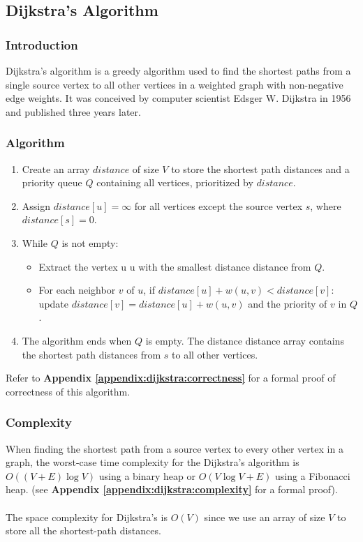 	\subsection{Dijkstra's Algorithm}
		\subsubsection{Introduction}
			Dijkstra's algorithm is a greedy algorithm used to find the shortest paths from a single source vertex to all other vertices in a weighted graph with non-negative edge weights. It was conceived by computer scientist Edsger W. Dijkstra in 1956 and published three years later.
		\subsubsection{Algorithm}
		\begin{enumerate}
			\item Create an array $distance$ of size $V$ to store the shortest path distances and a priority queue $Q$ containing all vertices, prioritized by $distance$.
			\item Assign $distance[u] = \infty$ for all vertices except the source vertex $s$, where $distance[s] = 0$.
			\item While $Q$ is not empty:
				\begin{itemize}
					\item Extract the vertex u u with the smallest distance distance from $Q$.
					\item For each neighbor $v$ of $u$, if $distance[u] + w(u,v) < distance[v]$: update $distance[v]=distance[u]+w(u,v)$ and the priority of $v$ in $Q$.
				\end{itemize}
			\item The algorithm ends when $Q$ is empty. The distance distance array contains the shortest path distances from $s$ to all other vertices.
		\end{enumerate}
			Refer to \textbf{Appendix \ref{appendix:dijkstra:correctness}} for a formal proof of correctness of this algorithm.
		\subsubsection{Complexity}
			When finding the shortest path from a source vertex to every other vertex in a graph, the worst-case time complexity for the Dijkstra's algorithm is $O((V+E)\log{V})$ using a binary heap or $O(V\log{V}+E)$ using a Fibonacci heap. (see \textbf{Appendix \ref{appendix:dijkstra:complexity}} for a formal proof). \\ \\
			The space complexity for Dijkstra's is $O(V)$ since we use an array of size $V$ to store all the shortest-path distances.
